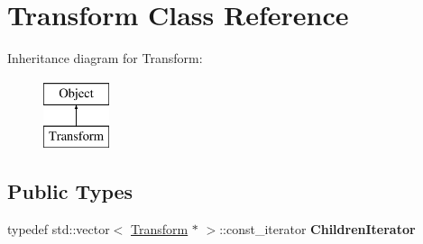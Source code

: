 \hypertarget{class_transform}{
\section{Transform Class Reference}
\label{class_transform}
}
Inheritance diagram for Transform:\begin{figure}[H]
\begin{center}
\leavevmode
\includegraphics[height=2.000000cm]{class_transform}
\end{center}
\end{figure}
\subsection*{Public Types}
\begin{DoxyCompactItemize}
\item 
\hypertarget{class_transform_af3334261b0dc6bd65a7666bb5878db6c}{
typedef std::vector$<$ \hyperlink{class_transform}{Transform} $\ast$ $>$::const\_\-iterator {\bfseries ChildrenIterator}}
\label{class_transform_af3334261b0dc6bd65a7666bb5878db6c}

\end{DoxyCompactItemize}
